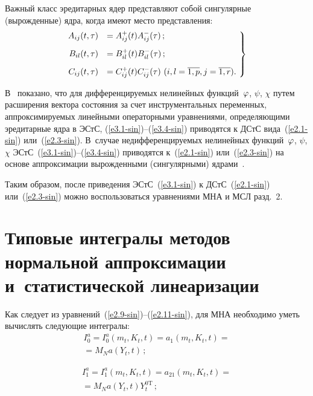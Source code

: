 \begin{multicols}{2}
Важный класс  эредитарных ядер представляют собой
сингулярные (вырожденные) ядра, когда имеют место представления:
\begin{equation}
\left.
\hspace*{-3mm}\begin{array}{rl}
A_{ij} (t,\tau) &= A_{ij}^+(t) A_{ij}^-(\tau)\,;\\[9pt]
B_{i l} (t,\tau)& = B_{il}^+(t) B_{il}^-(\tau)\,;\\[9pt]
C_{ij} (t,\tau) &= C_{ij}^+ ( t) C_{ij}^- (\tau)\
(i,l= \overline{1,p}, j=\overline{1,r}).
\end{array}\!
\right\}\!\!
\label{e3.5-sin}
\end{equation}

В~\cite{6-sin, 5-sin, 7-sin} показано, что для дифференцируемых нелинейных
функций~$\varphi$, $\psi$, $\chi$ путем расширения вектора состояния за счет
инструментальных переменных, аппроксимируемых линейными операторными уравнениями,
определяющими эредитарные ядра в ЭСтС, (\ref{e3.1-sin})--(\ref{e3.4-sin})
приводятся к ДСтС вида~(\ref{e2.1-sin}) или~(\ref{e2.3-sin}).
В~случае недифференцируемых нелинейных функций~$\varphi$, $\psi$, $\chi$
ЭСтС~(\ref{e3.1-sin})--(\ref{e3.4-sin}) приводятся к~(\ref{e2.1-sin}) или~(\ref{e2.3-sin})
на основе аппроксимации вырожденными (сингулярными) ядрами~\cite{6-sin, 5-sin, 7-sin}.

Таким образом, после приведения ЭСтС~(\ref{e3.1-sin}) к ДСтС~(\ref{e2.1-sin})
или~(\ref{e2.3-sin}) можно воспользоваться уравнениями МНА и МСЛ разд.~2.

\section{Типовые интегралы методов нормальной аппроксимации и~статистической
линеаризации}

Как следует из уравнений~(\ref{e2.9-sin})--(\ref{e2.11-sin}),
для МНА необходимо уметь вычислять следующие интегралы:
\begin{multline}
I_0^a = I_0^a (m_t, K_t, t) = a_1 (m_t, K_t, t)={}\\
{}= M_N a(Y_t, t)\,;
\label{e4.1-sin}
\end{multline}

\vspace*{-12pt}

\noindent
\begin{multline}
I_1^a = I_1^a (m_t, K_t, t)= a_{21}(m_t, K_t, t)= {}\\
{}=M_N a(Y_t , t) Y_t^{0\mathrm{T}}\,;\label{e4.2-sin}
\end{multline}


\end{multicols}
